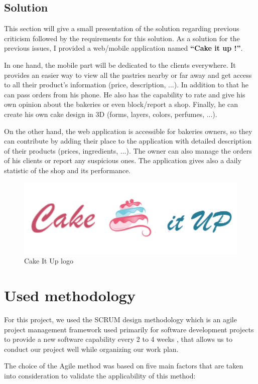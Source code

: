 \documentclass[12pt,a4paper]{report}
\begin{document}
	\subsection{Solution}
	This section will give a small presentation of the solution regarding previous criticism followed by the requirements for this solution.
	As a solution for the previous issues, I provided a web/mobile application named \textbf{``Cake it up !''}.\par
	In one hand, the mobile part will be dedicated to the clients everywhere. It provides an easier way to view all the pastries nearby or far away and get access to all their product's information (price, description, ...). In addition to that he can pass orders from his phone. He also has the capability to rate and give his own opinion about the bakeries or even block/report a shop. Finally, he can create his own cake design in 3D (forms, layers, colors, perfumes, ...). \par
	On the other hand, the web application is accessible for bakeries owners, so they can contribute by adding their place to the application with detailed description of their products (prices, ingredients, ...). The owner can also manage the orders of his clients or report any suspicious ones. The application gives also a daily statistic of the shop and its performance.
	
		\begin{figure}[H]
		\centering
		\includegraphics[width=5in,keepaspectratio]{logowithtxt.png}
		\caption{ Cake It Up logo\protect{}\protect\footnotemark[\thefootnote]}
		
		
		\label{logo-ciu}
	\end{figure}
	
	\section{Used methodology}
	
	For this project, we used the SCRUM design methodology which is an agile project management framework used primarily for software development projects to provide a new software capability every 2 to 4 weeks , that allows us to conduct our project well while organizing our work plan. \cite{scrumBook}\par 
	The choice of the Agile method was based on five main factors that are taken into consideration to validate the applicability of this method:\par
	
\end{document}
